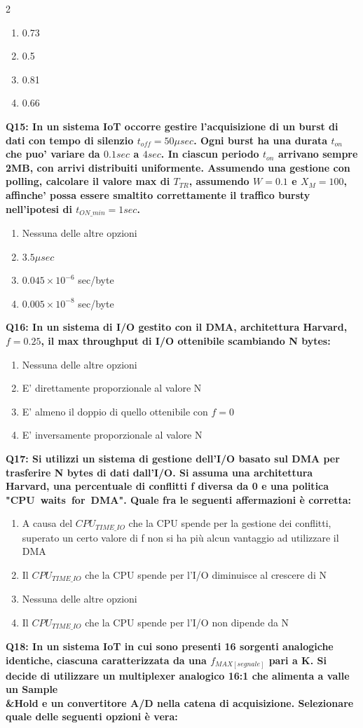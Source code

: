 \documentclass[10pt]{article}
\begin{document}
\begin{multicols}{2}
\begin{enumerate}[label=\arabic*.]
\item 0.73
\item 0.5
\item 0.81
\item 0.66
\end{enumerate}
\textbf{Q15: In un sistema IoT occorre gestire l'acquisizione di un burst di dati con tempo di silenzio $t_{off}=50 \mu sec$. Ogni burst ha una durata $t_{on}$ che puo' variare da $0.1 sec$ a $4 sec$. In ciascun periodo $t_{on}$ arrivano sempre 2MB, con arrivi distribuiti uniformente. Assumendo una gestione con polling, calcolare il valore max di $T_{TR}$, assumendo $W=0.1$ e $X_M = 100$, affinche' possa essere smaltito correttamente il traffico bursty nell'ipotesi di $t_{ON\_min}=1 sec$.}

\begin{enumerate}[label=\arabic*.]
\item Nessuna delle altre opzioni
\item $3.5 \mu sec$
\item $0.045\times10^{-6}$ sec/byte
\item $0.005\times10^{-8}$ sec/byte
\end{enumerate}
\textbf{Q16: In un sistema di I/O gestito con il DMA, architettura Harvard, $f=0.25$, il max throughput di I/O ottenibile scambiando N bytes:}

\begin{enumerate}[label=\arabic*.]
\item Nessuna delle altre opzioni
\item E' direttamente proporzionale al valore N
\item E' almeno il doppio di quello ottenibile con $f=0$
\item E' inversamente proporzionale al valore N
\end{enumerate}
\textbf{Q17: Si utilizzi un sistema di gestione dell’I/O basato sul DMA per trasferire N bytes di dati dall’I/O. Si assuma una architettura Harvard, una percentuale di conflitti f diversa da 0 e una politica "CPU waits for DMA". Quale fra le seguenti affermazioni è corretta:}

\begin{enumerate}[label=\arabic*.]
\item A causa del $CPU_{TIME\_IO}$ che la CPU spende per la gestione dei conflitti, superato un certo valore di f non si ha più alcun vantaggio ad utilizzare il DMA
\item Il $CPU_{TIME\_IO}$ che la CPU spende per l’I/O diminuisce al crescere di N
\item Nessuna delle altre opzioni
\item Il $CPU_{TIME\_IO}$ che la CPU spende per l’I/O non dipende da N
\end{enumerate}
\textbf{Q18: In un sistema IoT in cui sono presenti 16 sorgenti analogiche identiche, ciascuna caratterizzata da una $f_{MAX[segnale]}$ pari a K. Si decide di utilizzare un multiplexer analogico 16:1 che alimenta a valle un Sample\\\&Hold e un convertitore A/D nella catena di acquisizione. Selezionare quale delle seguenti opzioni è vera:}


\end{multicols}
\end{document}

